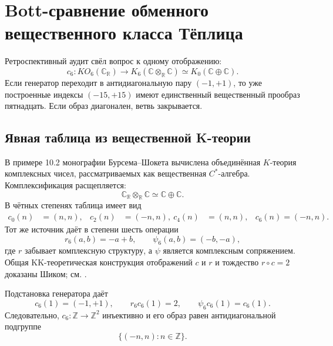 \chapter{Bott-сравнение обменного вещественного класса Тёплица}

Ретроспективный аудит свёл вопрос к одному отображению:
\begin{equation}
 c_6:KO_6(\mathbb C_{\mathbb R})
 \longrightarrow
 K_6(\mathbb C\otimes_{\mathbb R}\mathbb C)
 \simeq K_0(\mathbb C\oplus\mathbb C).
 \label{eq:v5-bott-comparison-target}
\end{equation}
Если генератор переходит в антидиагональную пару $(-1,+1)$, то уже
построенные индексы $(-15,+15)$ имеют единственный вещественный прообраз
пятнадцать. Если образ диагонален, ветвь закрывается.

\section{Явная таблица из вещественной K-теории}

В примере 10.2 монографии Бурсема--Шокета
 вычислена объединённая $K$-теория комплексных
чисел, рассматриваемых как вещественная $C^*$-алгебра. Комплексификация
расщепляется:
\begin{equation}
 \mathbb C_{\mathbb R}\otimes_{\mathbb R}\mathbb C
 \simeq\mathbb C\oplus\mathbb C.
 \label{eq:v5-bott-c-complexification}
\end{equation}
В чётных степенях таблица имеет вид
\begin{align}
 c_0(n)&=(n,n),&
 c_2(n)&=(-n,n),\
 c_4(n)&=(n,n),&
 \boxed{c_6(n)=(-n,n).}
 \label{eq:v5-bott-c-even-maps}
\end{align}
Тот же источник даёт в степени шесть операции
\begin{equation}
 r_6(a,b)=-a+b,
 \qquad
 \psi_6(a,b)=(-b,-a),
 \label{eq:v5-bott-r-psi-six}
\end{equation}
где $r$ забывает комплексную структуру, а $\psi$ является комплексным
сопряжением. Общая KK-теоретическая конструкция отображений $c$ и $r$ и
тождество $r\circ c=2$ доказаны Шиком; см.
.

Подстановка генератора даёт
\begin{equation}
 c_6(1)=(-1,+1),
 \qquad
 r_6c_6(1)=2,
 \qquad
 \psi_6c_6(1)=c_6(1).
 \label{eq:v5-bott-generator-checks}
\end{equation}
Следовательно, $c_6:\mathbb Z\to\mathbb Z^2$ инъективно и его образ
равен антидиагональной подгруппе
\begin{equation}
 \{(-n,n):n\in\mathbb Z\}.
 \label{eq:v5-bott-antidiagonal-image}
\end{equation}

